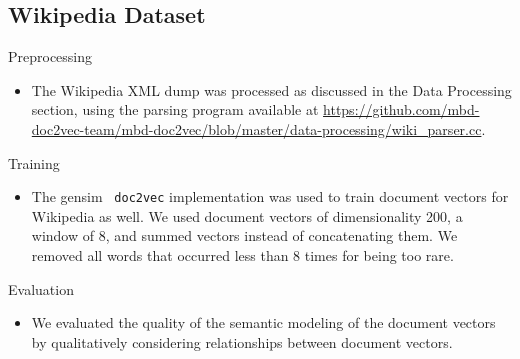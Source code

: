 \documentclass[11pt]{article}
\begin{document}
\subsection*{Wikipedia Dataset}
\begin{description}
  \item Preprocessing
    \begin{itemize}
      \item The Wikipedia XML dump was processed as discussed in the Data
            Processing section, using the parsing program available at
            \url{https://github.com/mbd-doc2vec-team/mbd-doc2vec/blob/master/data-processing/wiki_parser.cc}.
    \end{itemize}
  \item Training
    \begin{itemize}
      \item The gensim~\cite{gensim} \texttt{doc2vec} implementation was used
            to train document vectors for Wikipedia as well. We used document
            vectors of dimensionality 200, a window of 8, and summed vectors
            instead of concatenating them. We removed all words that occurred
            less than 8 times for being too rare.
    \end{itemize}
  \item Evaluation
    \begin{itemize}
      \item We evaluated the quality of the semantic modeling of the
            document vectors by qualitatively considering relationships between
            document vectors.
    \end{itemize}
\end{description}
\end{document}
